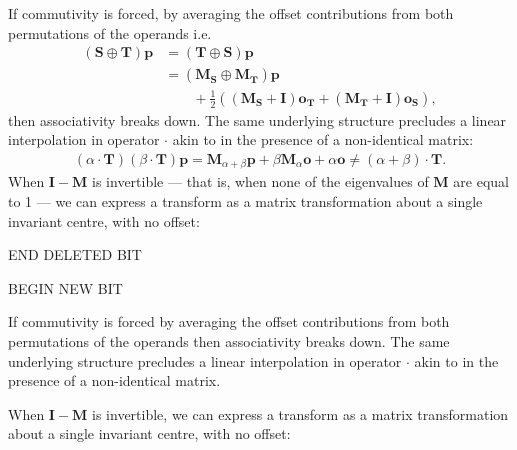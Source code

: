         If commutivity is forced, by averaging the offset contributions from both permutations of the operands i.e.
        \begin{equation}
            \begin{split}
                (\mathbf{S} \oplus \mathbf{T})\mathbf{p} &= (\mathbf{T} \oplus \mathbf{S})\mathbf{p} \\
                                                         &= (\mathbf{M_S} \oplus \mathbf{M_T})\mathbf{p} \\
                                                         &\qquad + \frac{1}{2}\left(\left( \mathbf{M_S} + \mathbf{I} \right) \mathbf{o_T} + \left( \mathbf{M_T} + \mathbf{I} \right)\mathbf{o_S}\right),
            \end{split}
        \end{equation}
        then associativity breaks down. The same underlying structure precludes a linear interpolation in operator $\cdot$ akin to  in the presence of a non-identical matrix:
        \begin{gather}
            (\alpha \cdot \mathbf{T})(\beta \cdot \mathbf{T})\mathbf{p} = \mathbf{M}_{\alpha+\beta}\mathbf{p} + \beta\mathbf{M}_{\alpha}\mathbf{o} + \alpha\mathbf{o} \ne (\alpha + \beta) \cdot \mathbf{T}.
        \end{gather}
        When $\mathbf{I} - \mathbf{M}$ is invertible --- that is, when none of the eigenvalues of $\mathbf{M}$ are equal to 1 --- we can express a transform as a matrix transformation about a single invariant centre, with no offset:


        END DELETED BIT
        
       BEGIN NEW BIT
       
        If commutivity is forced by averaging the offset contributions from both permutations of the operands then associativity breaks down. The same underlying structure precludes a linear interpolation in operator $\cdot$ akin to  in the presence of a non-identical matrix.

        When $\mathbf{I} - \mathbf{M}$ is invertible, we can express a transform as a matrix transformation about a single invariant centre, with no offset:

